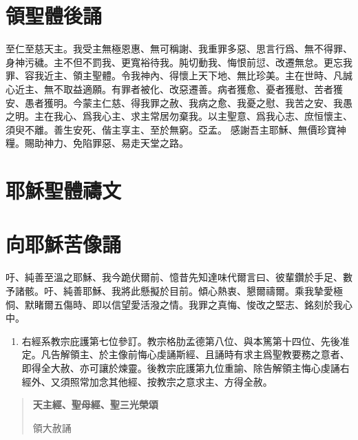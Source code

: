 \section*{領聖體後誦}
至仁至慈天主。我受主無極恩惠、無可稱謝、我重罪多惡、思言行爲、無不得罪、身神污穢。主不但不罰我、更寬裕待我。肫切動我、悔恨前愆、改遷無怠。更忘我罪、容我近主、領主聖體。令我神內、得懷上天下地、無比珍美。主在世時、凡誠心近主、無不取益適願。有罪者被化、改惡遷善。病者獲愈、憂者獲慰、苦者獲安、愚者獲明。今蒙主仁慈、得我罪之赦、我病之愈、我憂之慰、我苦之安、我愚之明。主在我心、爲我心主、求主常居勿棄我。以主聖意、爲我心志、庶恒懷主、須臾不離。善生安死、偕主享主、至於無窮。{\cspace}亞孟。
感謝吾主耶穌、無價珍寶神糧。賜助神力、免陷罪惡、易走天堂之路。
\section*{耶穌聖體禱文}
\section*{向耶穌苦像誦}
吁、純善至溫之耶穌、我今跪伏爾前、憶昔先知達味代爾言曰、彼輩鑽於手足、數予諸骸。吁、純善耶穌、我將此懸擬於目前。傾心熱衷、懇爾禱爾。乘我摯愛極恫、默睹爾五傷時、即以信望愛活潑之情。我罪之真悔、悛改之堅志、銘刻於我心中。

\begin{enumerate}
    \item[]{\small 右經系教宗庇護第七位參訂。教宗格肋孟德第八位、與本篤第十四位、先後准定。凡告解領主、於主像前悔心虔誦斯經、且誦時有求主爲聖教要務之意者、即得全大赦、亦可讓於煉靈。後教宗庇護第九位重諭、除告解領主悔心虔誦右經外、又須照常加念其他經、按教宗之意求主、方得全赦。}
\end{enumerate}
\begin{quote}\bfseries 天主經、聖母經、聖三光榮頌

領大赦誦\par
\end{quote}
